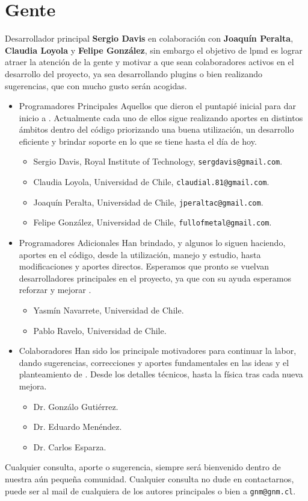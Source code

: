 \chapter{Gente}
\label{chap:auth}

Desarrollador principal \textbf{Sergio Davis} en colaboraci\'on con \textbf{Joaqu\'in Peralta}, \textbf{Claudia Loyola} y \textbf{Felipe Gonz\'alez}, sin embargo el objetivo de lpmd es lograr atraer la atenci\'on de la gente y motivar a que sean colaboradores activos en el desarrollo del proyecto, ya sea desarrollando plugins o bien realizando sugerencias, que con mucho gusto ser\'an acogidas.

\begin{itemize}

\item {Programadores Principales} Aquellos que dieron el puntapi\'e inicial para dar inicio a {\lpmd}. Actualmente cada uno de ellos sigue realizando aportes en distintos \'ambitos dentro del c\'odigo priorizando una buena utilizaci\'on, un desarrollo eficiente y brindar soporte en lo que se tiene hasta el d\'ia de hoy.

\begin{itemize}
 \item Sergio Davis, Royal Institute of Technology, \verb|sergdavis@gmail.com|.
 \item Claudia Loyola, Universidad de Chile, \verb|claudial.81@gmail.com|.
 \item Joaqu\'in Peralta, Universidad de Chile, \verb|jperaltac@gmail.com|.
 \item Felipe Gonz\'alez, Universidad de Chile, \verb|fullofmetal@gmail.com|.
\end{itemize}

\item {Programadores Adicionales} Han brindado, y algunos lo siguen haciendo, aportes en el c\'odigo, desde la utilizaci\'on, manejo y estudio, hasta modificaciones y aportes directos. Esperamos que pronto se vuelvan desarrolladores principales en el proyecto, ya que con su ayuda esperamos reforzar y mejorar {\lpmd}.

\begin{itemize}
 \item Yasm\'in Navarrete, Universidad de Chile.
 \item Pablo Ravelo, Universidad de Chile.
\end{itemize}

\item{Colaboradores} Han sido los principale motivadores para continuar la labor, dando sugerencias, correcciones y aportes fundamentales en las ideas y el planteamiento de {\lpmd}. Desde los detalles t\'ecnicos, hasta la f\'isica tras cada nueva mejora.

\begin{itemize}
 \item Dr. Gonz\'alo Guti\'errez.
 \item Dr. Eduardo Men\'endez.
 \item Dr. Carlos Esparza.
\end{itemize}
\end{itemize}

Cualquier consulta, aporte o sugerencia, siempre ser\'a bienvenido dentro de nuestra a\'un peque\~na comunidad. Cualquier consulta no dude en contactarnos, puede ser al mail de cualquiera de los autores principales o bien a \verb|gnm@gnm.cl|.

